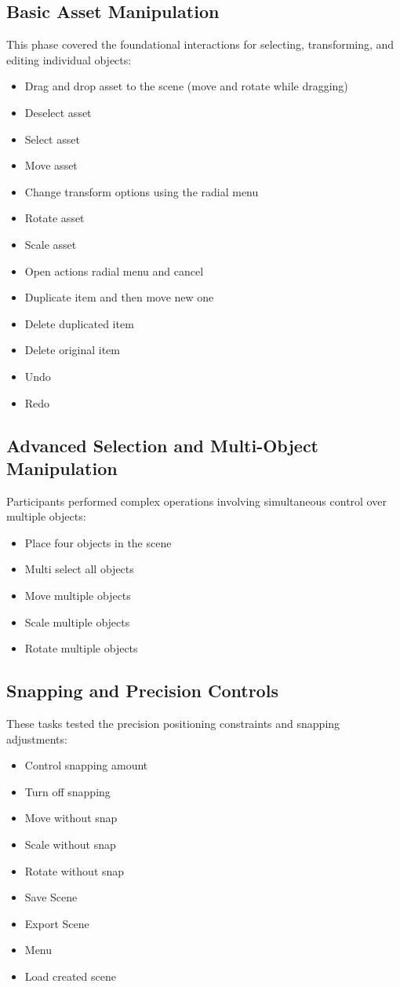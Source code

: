 \documentclass[inscr,ack,preface]{dithesis}
\begin{document}
\subsection{Basic Asset Manipulation}
This phase covered the foundational interactions for selecting, transforming, and editing individual objects:
\begin{itemize}
  \item Drag and drop asset to the scene (move and rotate while dragging)
  \item Deselect asset
  \item Select asset
  \item Move asset
  \item Change transform options using the radial menu
  \item Rotate asset
  \item Scale asset
  \item Open actions radial menu and cancel
  \item Duplicate item and then move new one
  \item Delete duplicated item
  \item Delete original item
  \item Undo
  \item Redo
\end{itemize}

\subsection{Advanced Selection and Multi-Object Manipulation}
Participants performed complex operations involving simultaneous control over multiple objects:
\begin{itemize}
  \item Place four objects in the scene
  \item Multi select all objects
  \item Move multiple objects
  \item Scale multiple objects
  \item Rotate multiple objects
\end{itemize}

\subsection{Snapping and Precision Controls}
These tasks tested the precision positioning constraints and snapping adjustments:
\begin{itemize}
  \item Control snapping amount
  \item Turn off snapping
  \item Move without snap
  \item Scale without snap
  \item Rotate without snap
  \item Save Scene
  \item Export Scene
  \item Menu
  \item Load created scene
\end{itemize}
\end{document}
